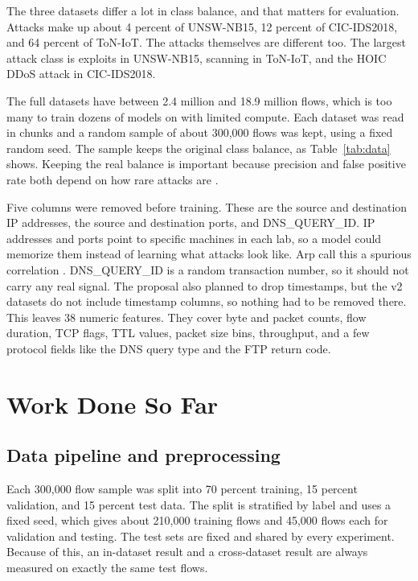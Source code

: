 \documentclass[10pt,twocolumn,letterpaper]{article}
\begin{document}
The three datasets differ a lot in class balance, and that matters for evaluation. Attacks make up about 4 percent of UNSW-NB15, 12 percent of CIC-IDS2018, and 64 percent of ToN-IoT. The attacks themselves are different too. The largest attack class is exploits in UNSW-NB15, scanning in ToN-IoT, and the HOIC DDoS attack in CIC-IDS2018.

The full datasets have between 2.4 million and 18.9 million flows, which is too many to train dozens of models on with limited compute. Each dataset was read in chunks and a random sample of about 300,000 flows was kept, using a fixed random seed. The sample keeps the original class balance, as Table~\ref{tab:data} shows. Keeping the real balance is important because precision and false positive rate both depend on how rare attacks are \cite{arp2022}.

Five columns were removed before training. These are the source and destination IP addresses, the source and destination ports, and DNS\_QUERY\_ID. IP addresses and ports point to specific machines in each lab, so a model could memorize them instead of learning what attacks look like. Arp \etal call this a spurious correlation \cite{arp2022}. DNS\_QUERY\_ID is a random transaction number, so it should not carry any real signal. The proposal also planned to drop timestamps, but the v2 datasets do not include timestamp columns, so nothing had to be removed there. This leaves 38 numeric features. They cover byte and packet counts, flow duration, TCP flags, TTL values, packet size bins, throughput, and a few protocol fields like the DNS query type and the FTP return code.

\section{Work Done So Far}

\subsection{Data pipeline and preprocessing}

Each 300,000 flow sample was split into 70 percent training, 15 percent validation, and 15 percent test data. The split is stratified by label and uses a fixed seed, which gives about 210,000 training flows and 45,000 flows each for validation and testing. The test sets are fixed and shared by every experiment. Because of this, an in-dataset result and a cross-dataset result are always measured on exactly the same test flows.
\end{document}
